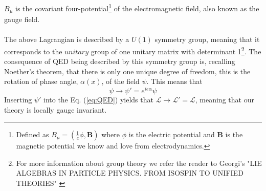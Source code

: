 \documentclass[12pt, a4paper]{book}
\begin{document}
$B_\mu$ is the covariant four-potential\footnote{Defined as $B_\mu = (\frac{1}{c}\phi, \mathbf{B})$ where $\phi$ is the electric potential and $\mathbf{B}$ is the magnetic potential we know and love from electrodynamics. } of the electromagnetic field, also known as the gauge field.\\ 
\\The above Lagrangian is described by a $U(1)$ symmetry group, meaning that it corresponds to the $unitary$ group of one unitary matrix with determinant 1\footnote{For more information about group theory we refer the reader to Georgi's "LIE ALGEBRAS IN PARTICLE PHYSICS. FROM ISOSPIN TO UNIFIED THEORIES" \cite{Georgi:1982jb}}. 
The consequence of QED being described by this symmetry group is, recalling Noether's theorem, that there is only one unique degree of freedom, this is the rotation of phase angle, $\alpha(x)$, of the field $\psi$. This means that 
\begin{equation}\label{eq:gauge_psi}
    \psi \rightarrow \psi' = e^{ie\alpha}\psi
\end{equation}
Inserting $\psi'$ into the Eq. (\ref{eq:QED}) yields that $\mathcal{L}\rightarrow\mathcal{L}'=\mathcal{L}$, meaning that our theory is locally gauge invariant.
\end{document}
